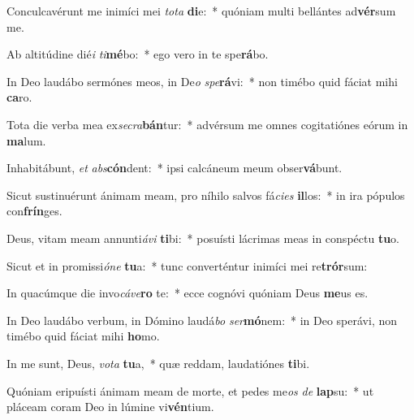 \item Conculcavérunt me inimíci mei \textit{to}\textit{ta} \textbf{di}e:~* quóniam multi bellántes ad\textbf{vér}sum me.
\item Ab altitúdine dié\textit{i} \textit{ti}\textbf{mé}bo:~* ego vero in te spe\textbf{rá}bo.
\item In Deo laudábo sermónes meos, in De\textit{o} \textit{spe}\textbf{rá}vi:~* non timébo quid fáciat mihi \textbf{ca}ro.
\item Tota die verba mea ex\textit{se}\textit{cra}\textbf{bán}tur:~* advérsum me omnes cogitatiónes eórum in \textbf{ma}lum.
\item Inhabitábunt, \textit{et} \textit{abs}\textbf{cón}dent:~* ipsi calcáneum meum obser\textbf{vá}bunt.
\item Sicut sustinuérunt ánimam meam, pro níhilo salvos fá\textit{ci}\textit{es} \textbf{il}los:~* in ira pópulos con\textbf{frín}ges.
\item Deus, vitam meam annunti\textit{á}\textit{vi} \textbf{ti}bi:~* posuísti lácrimas meas in conspéctu \textbf{tu}o.
\item Sicut et in promissi\textit{ó}\textit{ne} \textbf{tu}a:~* tunc converténtur inimíci mei re\textbf{trór}sum:
\item In quacúmque die invo\textit{cá}\textit{ve}\textbf{ro} te:~* ecce cognóvi quóniam Deus \textbf{me}us es.
\item In Deo laudábo verbum, in Dómino laudá\textit{bo} \textit{ser}\textbf{mó}nem:~* in Deo sperávi, non timébo quid fáciat mihi \textbf{ho}mo.
\item In me sunt, Deus, \textit{vo}\textit{ta} \textbf{tu}a,~* quæ reddam, laudatiónes \textbf{ti}bi.
\item Quóniam eripuísti ánimam meam de morte, et pedes me\textit{os} \textit{de} \textbf{lap}su:~* ut pláceam coram Deo in lúmine vi\textbf{vén}tium.

